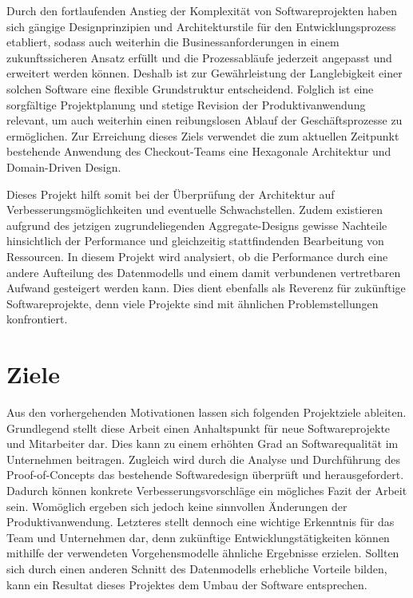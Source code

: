 Durch den fortlaufenden Anstieg der Komplexität von Softwareprojekten \cite{Darcy.2010} haben sich gängige Designprinzipien und Architekturstile für den Entwicklungsprozess etabliert, sodass auch weiterhin die Businessanforderungen in einem zukunftssicheren Ansatz erfüllt und die Prozessabläufe jederzeit angepasst und erweitert werden können. Deshalb ist zur Gewährleistung der Langlebigkeit einer solchen Software eine flexible Grundstruktur entscheidend. Folglich ist eine sorgfältige Projektplanung und stetige Revision der Produktivanwendung relevant, um auch weiterhin einen reibungslosen Ablauf der Geschäftsprozesse zu ermöglichen. Zur Erreichung dieses Ziels verwendet die zum aktuellen Zeitpunkt bestehende Anwendung des Checkout-Teams eine Hexagonale Architektur und Domain-Driven Design.

Dieses Projekt hilft somit bei der Überprüfung der Architektur auf Verbesserungsmöglichkeiten und eventuelle Schwachstellen. Zudem existieren aufgrund des jetzigen zugrundeliegenden Aggregate-Designs gewisse Nachteile hinsichtlich der Performance und gleichzeitig stattfindenden Bearbeitung von Ressourcen. In diesem Projekt wird analysiert, ob die Performance durch eine andere Aufteilung des Datenmodells und einem damit verbundenen vertretbaren Aufwand gesteigert werden kann. Dies dient ebenfalls als Reverenz für zukünftige Softwareprojekte, denn viele Projekte sind mit ähnlichen Problemstellungen konfrontiert.



\section{Ziele}

Aus den vorhergehenden Motivationen lassen sich folgenden Projektziele ableiten. Grundlegend stellt diese Arbeit einen Anhaltspunkt für neue Softwareprojekte und Mitarbeiter dar. Dies kann zu einem erhöhten Grad an Softwarequalität im Unternehmen beitragen. Zugleich wird durch die Analyse und Durchführung des Proof-of-Concepts das bestehende Softwaredesign überprüft und herausgefordert. Dadurch können konkrete Verbesserungsvorschläge ein mögliches Fazit der Arbeit sein. Womöglich ergeben sich jedoch keine sinnvollen Änderungen der Produktivanwendung. Letzteres stellt dennoch eine wichtige Erkenntnis für das Team und Unternehmen dar, denn zukünftige Entwicklungstätigkeiten können mithilfe der verwendeten Vorgehensmodelle ähnliche Ergebnisse erzielen. Sollten sich durch einen anderen Schnitt des Datenmodells erhebliche Vorteile bilden, kann ein Resultat dieses Projektes dem Umbau der Software entsprechen.
